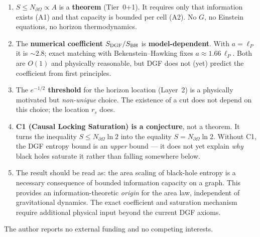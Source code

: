 \documentclass[aps,prd,twocolumn,superscriptaddress,nofootinbib,floatfix]{revtex4-2}
\begin{document}
\begin{enumerate}
  \item $S\le N_{\partial\Omega}\propto A$ is a \textbf{theorem}
    (Tier~0+1).  It requires only that information exists (A1) and that
    capacity is bounded per cell (A2).  No $G$, no Einstein equations,
    no horizon thermodynamics.
  \item The \textbf{numerical coefficient} $S_{\rm DGF}/S_{\rm BH}$ is
    \textbf{model-dependent}.  With $a=\ell_P$ it is $\sim 2.8$; exact
    matching with Bekenstein--Hawking fixes $a\approx 1.66\,\ell_P$.
    Both are $O(1)$ and physically reasonable, but DGF does not (yet)
    predict the coefficient from first principles.
  \item The \textbf{$e^{-1/2}$ threshold} for the horizon location
    (Layer~2) is a physically motivated but \emph{non-unique} choice.
    The existence of a cut does not depend on this choice; the location
    $r_s$ does.
  \item \textbf{C1 (Causal Locking Saturation) is a conjecture}, not a
    theorem.  It turns the inequality $S\le N_{\partial\Omega}\ln 2$ into
    the equality $S=N_{\partial\Omega}\ln 2$.  Without C1, the DGF
    entropy bound is an \emph{upper} bound --- it does not yet explain
    \emph{why} black holes saturate it rather than falling somewhere
    below.
  \item The result should be read as: the area scaling of black-hole
    entropy is a necessary consequence of bounded information capacity on
    a graph.  This provides an information-theoretic \emph{origin} for the
    area law, independent of gravitational dynamics.  The exact coefficient
    and saturation mechanism require additional physical input beyond the
    current DGF axioms.
\end{enumerate}

\begin{acknowledgments}
The author reports no external funding and no competing interests.
\end{acknowledgments}
\end{document}
